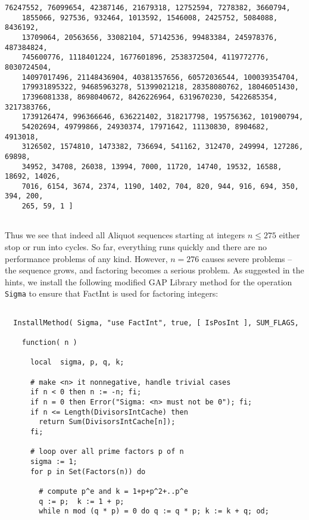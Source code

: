 \documentclass[a4paper,11pt]{report}
\begin{document}
{{\begin{Verbatim}[fontsize=\small,frame=single,label=GAP session log]
    76247552, 76099654, 42387146, 21679318, 12752594, 7278382, 3660794, 
    1855066, 927536, 932464, 1013592, 1546008, 2425752, 5084088, 8436192, 
    13709064, 20563656, 33082104, 57142536, 99483384, 245978376, 487384824, 
    745600776, 1118401224, 1677601896, 2538372504, 4119772776, 8030724504, 
    14097017496, 21148436904, 40381357656, 60572036544, 100039354704, 
    179931895322, 94685963278, 51399021218, 28358080762, 18046051430, 
    17396081338, 8698040672, 8426226964, 6319670230, 5422685354, 3217383766, 
    1739126474, 996366646, 636221402, 318217798, 195756362, 101900794, 
    54202694, 49799866, 24930374, 17971642, 11130830, 8904682, 4913018, 
    3126502, 1574810, 1473382, 736694, 541162, 312470, 249994, 127286, 69898, 
    34952, 34708, 26038, 13994, 7000, 11720, 14740, 19532, 16588, 18692, 14026, 
    7016, 6154, 3674, 2374, 1190, 1402, 704, 820, 944, 916, 694, 350, 394, 200, 
    265, 59, 1 ]
  
\end{Verbatim}
   Thus we see that indeed all Aliquot sequences starting at integers $n \leq 275$ either stop or run into cycles. So far, everything runs quickly and there are
no performance problems of any kind. However, $n = 276$ causes severe problems -- the sequence grows, and factoring becomes a serious
problem. As suggested in the hints, we install the following modified \textsf{GAP} Library method for the operation \texttt{Sigma} to ensure that \textsf{FactInt}{\nobreakspace}\cite{FactInt} is used for factoring integers: 
\begin{Verbatim}[fontsize=\small,frame=single,label=GAP code]
  
  InstallMethod( Sigma, "use FactInt", true, [ IsPosInt ], SUM_FLAGS,
  
    function( n )
  
      local  sigma, p, q, k;
  
      # make <n> it nonnegative, handle trivial cases
      if n < 0 then n := -n; fi;
      if n = 0 then Error("Sigma: <n> must not be 0"); fi;
      if n <= Length(DivisorsIntCache) then
        return Sum(DivisorsIntCache[n]);
      fi;
  
      # loop over all prime factors p of n
      sigma := 1;
      for p in Set(Factors(n)) do
  
        # compute p^e and k = 1+p+p^2+..p^e
        q := p;  k := 1 + p;
        while n mod (q * p) = 0 do q := q * p; k := k + q; od;
     

\end{Verbatim}}}
\end{document}
